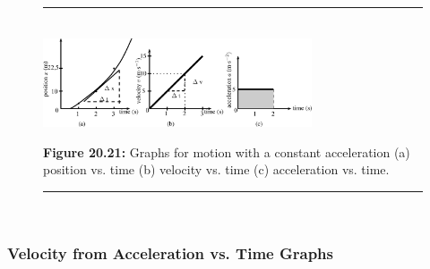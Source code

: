 	\begin{figure}[H] %
    \begin{center}
    \rule[.1in]{\figurerulewidth}{.005in} \\
        \label{m38795*uid114!!!underscore!!!media}\label{m38795*uid114!!!underscore!!!printimage}\includegraphics[width=300px]{col11305.imgs/m38795_PG10C2_026.png} %
        
      \vspace{2pt}
    \vspace{\rubberspace}\par \begin{cnxcaption}
	  \small \textbf{Figure 20.21: }Graphs for motion with a constant acceleration (a) position vs. time (b) velocity vs. time (c) acceleration vs. time.
	\end{cnxcaption}
      
    \vspace{.1in}
    \rule[.1in]{\figurerulewidth}{.005in} \\
        
    \end{center}

 \end{figure}   

    \addtocounter{footnote}{-0}
    
        \label{m38795*uid115}
            \subsubsection{ Velocity from Acceleration vs. Time Graphs}
            \nopagebreak
            
